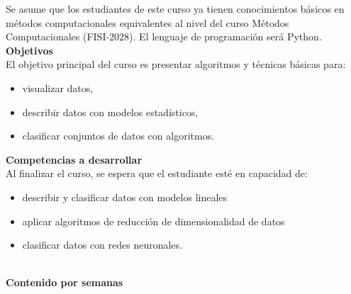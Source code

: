 \documentclass[letterpaper,10pt,onecolumn]{article}
\begin{document}
Se asume que los estudiantes de este curso ya tienen conocimientos
b\'asicos en m\'etodos computacionales equivalentes al nivel del curso
M\'etodos Computacionales (FISI-2028).
El lenguaje de programaci\'on ser\'a Python.
\\[0.1cm] 

\noindent\textbf{\large {} \quad Objetivos}\\[-0.2cm]

\noindent\normalsize El objetivo principal del curso es presentar
algoritmos y t\'ecnicas b\'asicas para:

\begin{itemize}
\item visualizar datos,
\\[-0.6cm]
\item describir datos con modelos estad\'isticos,
\\[-0.6cm]
\item clasificar conjuntos de datos con algoritmos.
\\[-0.6cm]
\end{itemize} 
\vspace*{0.5cm} 

\noindent\textbf{\large {} \quad Competencias a
  desarrollar}\\[-0.2cm] 


\noindent\normalsize Al finalizar el curso, se espera que el
estudiante est\'e en capacidad de: 

\begin{itemize}
\item describir y clasificar datos con modelos lineales \\[-0.6cm]   
\item aplicar algoritmos de reducci\'on de dimensionalidad de datos\\[-0.6cm]  
\item clasificar datos con redes neuronales.\\[-0.6cm]
\\[-0.6cm]  
\end{itemize}

\vspace*{0.5cm} 

\noindent\textbf{\large {} \quad Contenido por
  semanas}\\[-0.2cm]  
\end{document}
